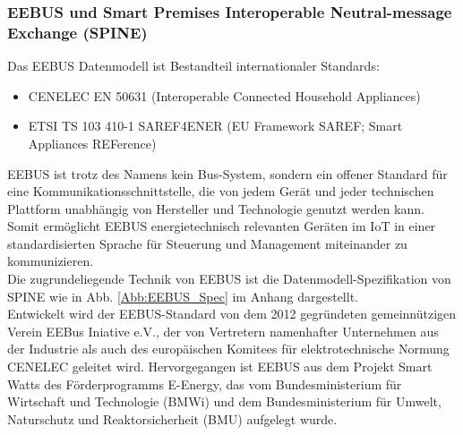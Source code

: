 				
				
				



				
			\subsubsection{EEBUS und Smart Premises Interoperable Neutral-message Exchange (SPINE)}
				Das EEBUS Datenmodell ist Bestandteil internationaler Standards:
				
				\begin{itemize}
					\item CENELEC EN 50631 (Interoperable Connected Household Appliances) \cite{CENELEC}
					\item ETSI TS 103 410-1 SAREF4ENER (EU Framework SAREF; Smart Appliances REFerence) \cite{Etsi}
				\end{itemize}
							EEBUS ist trotz des Namens kein Bus-System, sondern ein offener Standard für eine Kommunikationsschnittstelle, die von jedem Gerät und jeder technischen Plattform unabhängig von Hersteller und Technologie genutzt werden kann. Somit ermöglicht EEBUS energietechnisch relevanten Geräten im \ac{IoT} in einer standardisierten Sprache für Steuerung und Management miteinander zu kommunizieren. \\ %


			
				
				Die zugrundeliegende Technik von EEBUS ist die Datenmodell-Spezifikation von \ac{SPINE} wie in Abb. \ref{Abb:EEBUS_Spec} im Anhang dargestellt. \\
				
				Entwickelt wird der EEBUS-Standard von dem 2012 gegründeten gemeinnützigen Verein EEBus Iniative e.V., der von Vertretern namenhafter Unternehmen aus der Industrie als auch des europäischen Komitees für elektrotechnische Normung CENELEC geleitet wird. Hervorgegangen ist EEBUS aus dem Projekt Smart Watts des Förderprogramms E-Energy, das vom Bundesministerium für Wirtschaft und Technologie (BMWi) und dem Bundesministerium für Umwelt, Naturschutz und Reaktorsicherheit (BMU) aufgelegt wurde.\\

